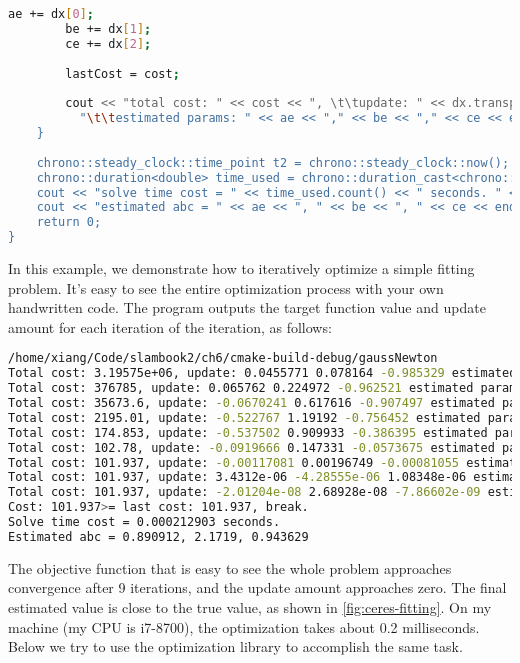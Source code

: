 \begin{lstlisting}[language=sh,caption=slambook2/ch6/gaussNewton.cpp]
        ae += dx[0];
        be += dx[1];
        ce += dx[2];
        
        lastCost = cost;
        
        cout << "total cost: " << cost << ", \t\tupdate: " << dx.transpose() <<
          "\t\testimated params: " << ae << "," << be << "," << ce << endl;
    }
    
    chrono::steady_clock::time_point t2 = chrono::steady_clock::now();
    chrono::duration<double> time_used = chrono::duration_cast<chrono::duration<double>>(t2 - t1);
    cout << "solve time cost = " << time_used.count() << " seconds. " << endl;
    cout << "estimated abc = " << ae << ", " << be << ", " << ce << endl;
    return 0;
}
\end{lstlisting}

In this example, we demonstrate how to iteratively optimize a simple fitting problem. It's easy to see the entire optimization process with your own handwritten code. The program outputs the target function value and update amount for each iteration of the iteration, as follows:
\begin{lstlisting}[language=sh,caption=Terminal output:]
/home/xiang/Code/slambook2/ch6/cmake-build-debug/gaussNewton
Total cost: 3.19575e+06, update: 0.0455771 0.078164 -0.985329 estimated params: 2.04558,-0.921836,4.01467
Total cost: 376785, update: 0.065762 0.224972 -0.962521 estimated params: 2.11134,-0.696864,3.05215
Total cost: 35673.6, update: -0.0670241 0.617616 -0.907497 estimated params: 2.04432,-0.0792484, 2.14465
Total cost: 2195.01, update: -0.522767 1.19192 -0.756452 estimated params: 1.52155, 1.11267, 1.3882
Total cost: 174.853, update: -0.537502 0.909933 -0.386395 estimated params: 0.984045,2.0226,1.00181
Total cost: 102.78, update: -0.0919666 0.147331 -0.0573675 estimated params: 0.892079,2.16994,0.944438
Total cost: 101.937, update: -0.00117081 0.00196749 -0.00081055 estimated params: 0.890908,2.1719,0.943628
Total cost: 101.937, update: 3.4312e-06 -4.28555e-06 1.08348e-06 estimated params: 0.890912,2.1719,0.943629
Total cost: 101.937, update: -2.01204e-08 2.68928e-08 -7.86602e-09 estimated params: 0.890912,2.1719,0.943629
Cost: 101.937>= last cost: 101.937, break.
Solve time cost = 0.000212903 seconds.
Estimated abc = 0.890912, 2.1719, 0.943629
\end{lstlisting}
The objective function that is easy to see the whole problem approaches convergence after 9 iterations, and the update amount approaches zero. The final estimated value is close to the true value, as shown in \autoref{fig:ceres-fitting}. On my machine (my CPU is i7-8700), the optimization takes about 0.2 milliseconds. Below we try to use the optimization library to accomplish the same task.

